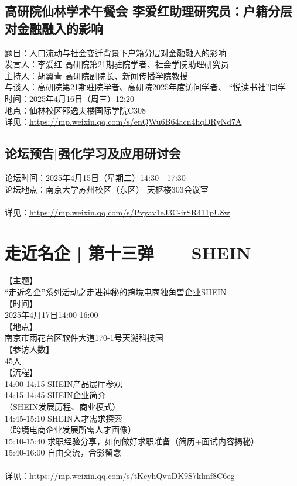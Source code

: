 \documentclass[letterpaper, 12pt]{article}
\begin{document}
\begin{multicols}{2}
\subsection{高研院仙林学术午餐会 李爱红助理研究员：户籍分层对金融融入的影响}
题目：人口流动与社会变迁背景下户籍分层对金融融入的影响
\\发言人：李爱红 高研院第21期驻院学者、社会学院助理研究员
\\主持人：胡翼青 高研院副院长、新闻传播学院教授
\\与谈人：高研院第21期驻院学者、高研院2025年度访问学者、 “悦读书社”同学
\\时间：2025年4月16日（周三）12:20
\\地点：仙林校区邵逸夫楼国际学院C308
\\详见：\url{https://mp.weixin.qq.com/s/enQWu6B64acn4hqDRyNd7A}

\subsection{论坛预告|强化学习及应用研讨会}
论坛时间：2025年4月15日（星期二）14:30—17:30
\\论坛地点：南京大学苏州校区（东区）  天枢楼303会议室
\\
\\详见：\url{https://mp.weixin.qq.com/s/Pvyav1eJ3C-irSR411pU8w}
\section{走近名企 | 第十三弹——SHEIN}
【主题】
\\“走近名企”系列活动之走进神秘的跨境电商独角兽企业SHEIN
\\【时间】
\\2025年4月17日14:00-16:00
\\【地点】
\\南京市雨花台区软件大道170-1号天溯科技园
\\【参访人数】
\\45人
\\【流程】
\\14:00-14:15 SHEIN产品展厅参观
\\14:15-14:45 SHEIN企业简介
\\（SHEIN发展历程、商业模式）
\\14:45-15:10 SHEIN人才需求探索
\\（跨境电商企业发展所需人才画像）
\\15:10-15:40 求职经验分享，如何做好求职准备（简历+面试内容揭秘）
\\15:40-16:00 自由交流，合影留念
\\
\\详见：\url{https://mp.weixin.qq.com/s/tKcyhQvuDK9S7klmf8C6eg}


\end{multicols}
\end{document}
